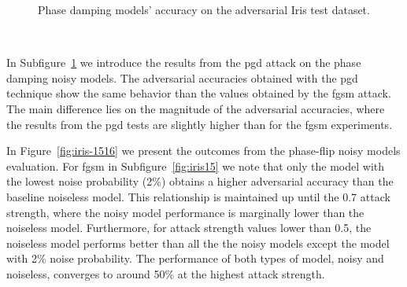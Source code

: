\begin{figure}[!h]
\begin{subfigure}{0.45\textwidth}
      \label{fig:iris14}
  \end{subfigure}
  \caption{Phase damping models' accuracy on the adversarial Iris test dataset.}
  \label{fig:iris-1314}
\end{figure} \

In Subfigure~\ref{fig:iris14} we introduce the results from the \ac{pgd}
attack on the phase damping noisy models. The adversarial accuracies
obtained with the \ac{pgd} technique show the same behavior than the
values obtained by the \ac{fgsm} attack. The main difference lies
on the magnitude of the adversarial accuracies, where the results
from the \ac{pgd} tests are slightly higher than for the \ac{fgsm}
experiments. \

In Figure~\ref{fig:iris-1516} we present the outcomes from the phase-flip
noisy models evaluation. For \ac{fgsm} in Subfigure~\ref{fig:iris15}
we note that only the model with the lowest noise probability (2\%)
obtains a higher adversarial accuracy than the baseline noiseless
model. This relationship is maintained up until the 0.7 attack strength,
where the noisy model performance is marginally lower than the noiseless
model. Furthermore, for attack strength values lower than 0.5, the noiseless
model performs better than all the the noisy models except the model
with 2\% noise probability. The performance of both types of model,
noisy and noiseless, converges to around 50\% at the highest attack
strength. \


